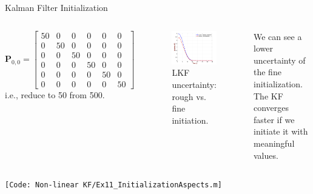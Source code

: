 \begin{frame}{Kalman Filter Initialization}
\begin{columns}
    \[\bm{P}_{0,0}=
\begin{bmatrix}
50 & 0 & 0 & 0 & 0 & 0 \\
0 & 50 & 0 & 0 & 0 & 0 \\
0 & 0 & 50 & 0 & 0 & 0 \\
0 & 0 & 0 & 50 & 0 & 0 \\
0 & 0 & 0 & 0 & 50 & 0 \\
0 & 0 & 0 & 0 & 0 & 50
\end{bmatrix}
\]
i.e., reduce to 50 from 500.
\begin{figure}
    \centering
    \includegraphics[width=0.7\linewidth]{Figures//Part4/Ex9_InitializationAspects.png}
    \vspace{-10pt}
    \caption{LKF uncertainty: rough vs. fine initiation.}
    \vspace{-10pt}
\end{figure}

We can see a lower uncertainty of the fine initialization. The KF converges faster if
we initiate it with meaningful values.
\end{columns}

\texttt{\tiny{[Code: Non-linear KF/Ex11\_InitializationAspects.m]}}
\end{frame}



